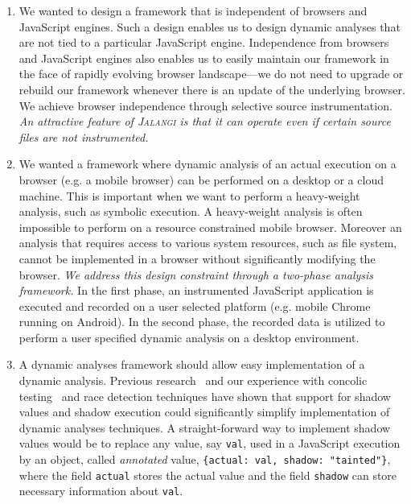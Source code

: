 \documentclass{sig-alternate}
\def\jalangi{\textsc{Jalangi}}
\begin{document}
\begin{enumerate}
\item We wanted to design a framework that is independent of browsers
  and JavaScript engines.  Such a design enables us to design dynamic
  analyses that are not tied to a particular JavaScript engine.
  Independence from browsers and JavaScript engines also enables us to
  easily maintain our framework in the face of rapidly evolving
  browser landscape---we do not need to upgrade or rebuild our
  framework whenever there is an update of the underlying browser.  We
  achieve browser independence through selective source
  instrumentation.  \emph{An attractive feature of \jalangi{} is that
    it can operate even if certain source files are not instrumented.}
\item We wanted a framework where dynamic analysis of an actual
  execution on a browser (e.g. a mobile browser) can be performed on a
  desktop or a cloud machine.  This is important when we want to
  perform a heavy-weight analysis, such as symbolic execution.  A
  heavy-weight analysis is often impossible to perform on a resource
  constrained mobile browser.  Moreover an analysis that requires
  access to various system resources, such as file system, cannot be
  implemented in a browser without significantly modifying the
  browser. \emph{We address this design constraint through a two-phase
    analysis framework.}  In the first phase, an instrumented
  JavaScript application is executed and recorded on a user selected
  platform (e.g. mobile Chrome running on Android).  In the second
  phase, the recorded data is utilized to perform a user specified
  dynamic analysis on a desktop environment.
\item A dynamic analyses framework should allow easy implementation of
  a dynamic analysis.  Previous
  research~\cite{Seward:2005:UVD:1247360.1247362,Nethercote:2007:VFH:1250734.1250746,hobbs,Bond:2007:TBA:1297027.1297057,songndss05}
  and our experience with concolic testing~\cite{dart,cute} and race
  detection techniques have shown that support for shadow values and
  shadow execution could significantly simplify implementation of
  dynamic analyses techniques.  A straight-forward way to implement
  shadow values would be to replace any value, say \texttt{val}, used
  in a JavaScript execution by an object, called \emph{annotated}
  value, \texttt{\{actual: val, shadow: "tainted"\}}, where the field
  \texttt{actual} stores the actual value and the field
  \texttt{shadow} can store necessary information about \texttt{val}.

\end{enumerate}
\end{document}
